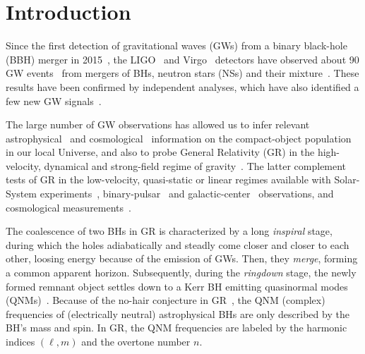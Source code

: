 \documentclass[twocolumn,
               prd,
               aps,
               superscriptaddress,
               tightenlines,
               nofootinbib,
               eqsecnum,
               amsfonts,
               amsmath,
               longbibliography]{revtex4-1}
\begin{document}
\section{Introduction}
\label{sec:intro}

Since the first detection of gravitational waves (GWs) from a binary black-hole (BBH) merger in 2015~\cite{LIGOScientific:2016aoc},
the LIGO~\cite{LIGOScientific:2014pky} and Virgo~\cite{VIRGO:2014yos} detectors have observed about 90 GW events~\cite{LIGOScientific:2021djp} from mergers
of BHs, neutron stars (NSs) \cite{TheLIGOScientific:2017qsa,LIGOScientific:2018cki,LIGOScientific:2020aai} and their mixture~\cite{LIGOScientific:2021qlt}. These results have been confirmed
by independent analyses, which have also identified a few new GW signals~\cite{Nitz:2018imz,Nitz:2019hdf,Venumadhav:2019lyq,Zackay:2019btq,Nitz:2021zwj,Olsen:2022pin}.

The large number of GW observations has allowed us to infer relevant astrophysical~\cite{LIGOScientific:2021aug} and cosmological~\cite{LIGOScientific:2021psn} information on the compact-object population in our local Universe, and also to probe General Relativity (GR) in the high-velocity, dynamical and strong-field regime of gravity~\cite{LIGOScientific:2021sio}. The latter complement tests of GR in the low-velocity, quasi-static or linear regimes available with Solar-System experiments~\cite{Will:2014kxa}, binary-pulsar~\cite{Wex:2014nva,Kramer:2021jcw} and galactic-center~\cite{GRAVITY:2018ofz,Do:2019txf,EventHorizonTelescope:2019ths} observations,
and cosmological measurements~\cite{Clifton:2011jh}.

The coalescence of two BHs in GR is characterized by a long \textit{inspiral} stage, during which the
holes adiabatically and steadly come closer and closer to each other, loosing energy because of the emission
of GWs. Then, they \textit{merge}, forming a common apparent horizon. Subsequently, during the \textit{ringdown} stage, the newly formed remnant object settles down to a Kerr BH emitting quasinormal modes (QNMs)~\cite{Vishveshwara:1970cc,Press:1971wr,Chandrasekhar:1975zza}. Because of the no-hair conjecture in GR~\cite{Carter:1971zc,Israel:1967wq,Hawking:1971vc,Robinson:1975bv}, the QNM (complex) frequencies of (electrically neutral) astrophysical BHs are only described by the BH's mass and spin. In GR, the QNM frequencies are labeled by the harmonic indices $(\ell,m)$ and the overtone number $n$.
\end{document}
